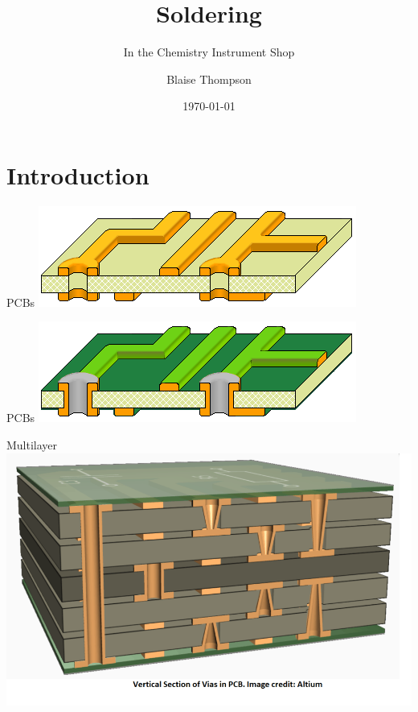 \documentclass{presentation}
\title{Soldering}
\subtitle{In the Chemistry Instrument Shop}
\author{Blaise Thompson}
\institute{University of Wisconsin--Madison}
\date{\today}
\begin{document}
\maketitle

\section{Introduction}

\begin{frame}{PCBs}
  \includegraphics[width=\textwidth]{"./Double Sided non-PTH2.PNG"}
\end{frame}

\begin{frame}{PCBs}
  \includegraphics[width=\textwidth]{"./Double Sided PTH and masked.png"}
\end{frame}

\begin{frame}{Multilayer}
  \includegraphics[width=\textwidth]{"./multilayer.png"}
\end{frame}
\end{document}
